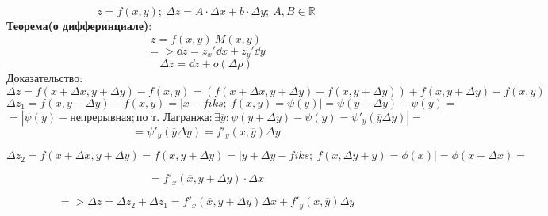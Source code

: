 \documentclass{article}
\begin{document}
\begin{equation*}
    z = f(x, y);\ \Delta z =A \cdot \Delta x + b \cdot \Delta y;\ A, B \in \mathbb{R}
\end{equation*}
\textbf{Теорема(о дифферинциале)}:\\
\begin{equation*}
    z = f(x,y) \ M(x,y)
\end{equation*}
\begin{equation*}
    => \dd z = z_x'\dd x + z_y'\dd y 
\end{equation*}
\begin{equation*}
    \Delta z = \dd z + o(\Delta \rho)
\end{equation*}
Доказательство:\\
\begin{equation*}
    \Delta z = f(x+\Delta x, y +\Delta y) - f(x, y) = (f(x+\Delta x, y + \Delta y) - f(x, y+\Delta y)) + f(x, y+\Delta y)- f(x, y)
\end{equation*}
\begin{equation*}
    \Delta z_1 = f(x, y+\Delta y) - f(x, y) = | x - fiks;\ f(x, y)= \psi(y) | = \psi(y +\Delta y)- \psi (y) = 
\end{equation*}
\begin{equation*}
    =|\psi(y) - \text{непрерывная}; \text{по т. Лагранжа}: \exists \overline{y}: \psi(y + \Delta y) - \psi(y) = \psi'_y(\overline{y}\Delta y) | = 
\end{equation*}
\begin{equation*}
    = \psi'_y(\overline{y}\Delta y) = f'_y(x, \overline{y})\Delta y
\end{equation*}

\begin{equation*}
    \Delta z_2 = f(x + \Delta x, y+  \Delta y) = f(x, y+ \Delta y) = |y+\Delta y - fiks;\ f(x, \Delta y +y) = \phi (x)| = \phi(x + \Delta x) = 
\end{equation*}

\begin{equation*}
    = f'_x(\overline{x}, y+\Delta y)\cdot \Delta x 
\end{equation*}

\begin{equation*}
    => \Delta z = \Delta z_2 +\Delta z_1 = f'_x(\overline{x}, y+\Delta y)\Delta x+ f'_y(x, \overline{y})\Delta y
\end{equation*}
\end{document}
